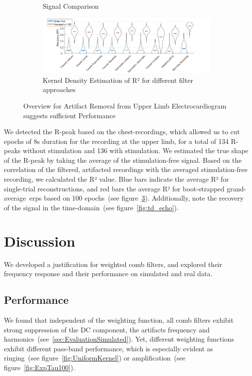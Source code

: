 \documentclass[a4paper]{article}
\newcommand{\figref}[1]{(see figure~\ref{#1})}
\newcommand{\secref}[1]{(see~\ref{#1})}
\begin{document}
\begin{figure}[hbtp]
\begin{subfigure}{.75\textwidth}
\begin{subfigure}{.45\textwidth}
        \end{subfigure}
    \caption{Signal Comparison}\label{fig:ecgRaw}
    \end{subfigure}
    \begin{subfigure}{1.0\textwidth}
        \includegraphics[width=\textwidth]{img/eva/ecg_R2.png}
        \caption{Kernel Density Estimation of R² for different filter approaches}\label{fig:ecgR2}
    \end{subfigure}
    \caption{Overview for Artifact Removal from Upper Limb Electrocardiogram suggests sufficient Performance}
\end{figure}

We detected the R-peak based on the chest-recordings, which allowed us to cut epochs of 8s duration for the recording at the upper limb, for a total of 134 R-peaks without stimulation and 136 with stimulation. We estimated the true shape of the R-peak by taking the average of the stimulation-free signal.
Based on  the correlation of the filtered, artifacted recordings with the averaged stimulation-free recording, we calculated the R² value.
Blue bars indicate the average R² for single-trial reconstructions, and red bars the average R² for boot-strapped grand-average~\gls{erp}s based on 100 epochs~\figref{fig:ecgR2}.
Additionally, note the recovery of the signal in the time-domain~\figref{fig:td_echo}.

\section{Discussion}

We developed a justification for weighted comb filters, and explored their frequency response and their performance on simulated and real data.

\subsection{Performance}\label{sec:discussPerformance}

We found that independent of the weighting function, all comb filters exhibit strong suppression of the DC component, the artifacts frequency and harmonics~\secref{sec:EvaluationSimulated}.
Yet, different weighting functions exhibit different pass-band performance, which is especially evident as ringing~\figref{fig:UniformKernel} or amplification~\figref{fig:ExpTau100}.
\end{document}

